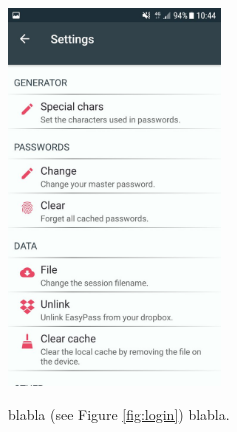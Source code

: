 \includegraphics[height=10cm]{settings.jpg}

\begin{center}
    \begin{minipage}{.3\textwidth}
    \end{minipage}
    \begin{minipage}{.3\textwidth}
    \end{minipage}
    \begin{minipage}{.3\textwidth}
    \end{minipage}        
\end{center}

blabla (see Figure \ref{fig:login}) blabla.

